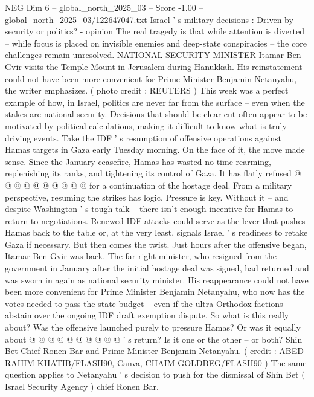 \begin{textsample}{NEG Dim 6 – global\_north\_2025\_03 – Score -1.00 – global\_north\_2025\_03/122647047.txt}  \label{ex:f6_neg_166}
Israel ' s military decisions : Driven by security or politics? - opinion The real tragedy is that while attention is diverted -- while focus is placed on invisible enemies and deep-state conspiracies -- the core challenges remain unresolved.
NATIONAL SECURITY MINISTER Itamar Ben-Gvir visits the Temple Mount in Jerusalem during Hanukkah.
His reinstatement could not have been more convenient for Prime Minister Benjamin Netanyahu, the writer emphasizes. ( photo credit : REUTERS ) This week was a perfect example of how, in Israel, politics are never far from the surface -- even when the stakes are national security.
Decisions that should be clear-cut often appear to be motivated by political calculations, making it difficult to know what is truly driving events.
Take the IDF ' s resumption of offensive operations against Hamas targets in Gaza early Tuesday morning.
On the face of it, the move made sense.
Since the January ceasefire, Hamas has wasted no time rearming, replenishing its ranks, and tightening its control of Gaza.
It has flatly refused @ @ @ @ @ @ @ @ @ @ for a continuation of the hostage deal.
From a military perspective, resuming the strikes has logic.
Pressure is key.
Without it -- and despite Washington ' s tough talk -- there isn't enough incentive for Hamas to return to negotiations.
Renewed IDF attacks could serve as the lever that pushes Hamas back to the table or, at the very least, signals Israel ' s readiness to retake Gaza if necessary.
But then comes the twist.
Just hours after the offensive began, Itamar Ben-Gvir was back.
The far-right minister, who resigned from the government in January after the initial hostage deal was signed, had returned and was sworn in again as national security minister.
His reappearance could not have been more convenient for Prime Minister Benjamin Netanyahu, who now has the votes needed to pass the state budget -- even if the ultra-Orthodox factions abstain over the ongoing IDF draft exemption dispute.
So what is this really about?
Was the offensive launched purely to pressure Hamas?
Or was it equally about @ @ @ @ @ @ @ @ @ @ ' s return?
Is it one or the other -- or both?
Shin Bet Chief Ronen Bar and Prime Minister Benjamin Netanyahu. ( credit : ABED RAHIM KHATIB/FLASH90, Canva, CHAIM GOLDBEG/FLASH90 ) The same question applies to Netanyahu ' s decision to push for the dismissal of Shin Bet ( Israel Security Agency ) chief Ronen Bar.

\end{textsample}
